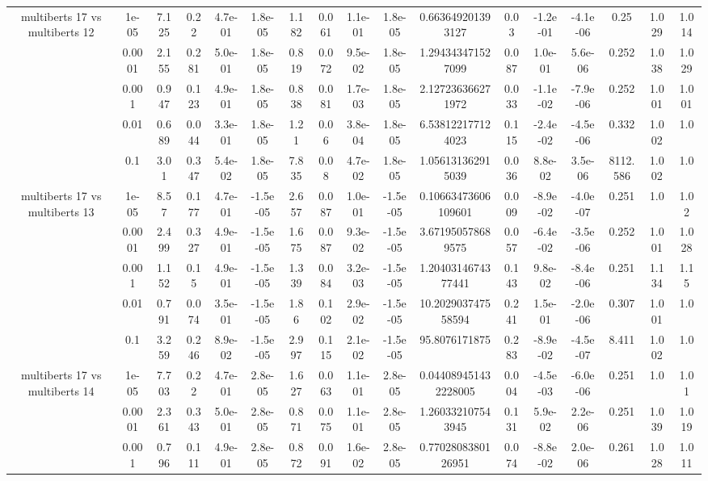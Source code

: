 \begin{tabular}{|c|c|c|c|c|c|c|c|c|c|c|c|c|c|c|c|c|}
\hline
\multirow{5}{*}{multiberts 17 vs multiberts 12} & 1e-05 & 7.125 & 0.22 & 4.7e-01 & 1.8e-05 & 1.182 & 0.061 & 1.1e-01 & 1.8e-05 & 0.663649201393127 & 0.03 & -1.2e-01 & -4.1e-06 & 0.25 & 1.029 & 1.014 \\
 & 0.0001 & 2.155 & 0.281 & 5.0e-01 & 1.8e-05 & 0.819 & 0.072 & 9.5e-02 & 1.8e-05 & 1.294343471527099 & 0.087 & 1.0e-01 & 5.6e-06 & 0.252 & 1.038 & 1.029 \\
 & 0.001 & 0.947 & 0.123 & 4.9e-01 & 1.8e-05 & 0.838 & 0.081 & 1.7e-03 & 1.8e-05 & 2.127236366271972 & 0.033 & -1.1e-02 & -7.9e-06 & 0.252 & 1.001 & 1.001 \\
 & 0.01 & 0.689 & 0.044 & 3.3e-01 & 1.8e-05 & 1.21 & 0.06 & 3.8e-04 & 1.8e-05 & 6.538122177124023 & 0.115 & -2.4e-02 & -4.5e-06 & 0.332 & 1.002 & 1.0 \\
 & 0.1 & 3.01 & 0.347 & 5.4e-02 & 1.8e-05 & 7.835 & 0.08 & 4.7e-02 & 1.8e-05 & 1.056131362915039 & 0.036 & 8.8e-02 & 3.5e-06 & 8112.586 & 1.002 & 1.0 \\
\hline
\multirow{5}{*}{multiberts 17 vs multiberts 13} & 1e-05 & 8.57 & 0.177 & 4.7e-01 & -1.5e-05 & 2.657 & 0.087 & 1.0e-01 & -1.5e-05 & 0.10663473606109601 & 0.009 & -8.9e-02 & -4.0e-07 & 0.251 & 1.0 & 1.02 \\
 & 0.0001 & 2.499 & 0.327 & 4.9e-01 & -1.5e-05 & 1.675 & 0.087 & 9.3e-02 & -1.5e-05 & 3.671950578689575 & 0.057 & -6.4e-02 & -3.5e-06 & 0.252 & 1.001 & 1.028 \\
 & 0.001 & 1.152 & 0.15 & 4.9e-01 & -1.5e-05 & 1.339 & 0.084 & 3.2e-03 & -1.5e-05 & 1.2040314674377441 & 0.143 & 9.8e-02 & -8.4e-06 & 0.251 & 1.134 & 1.15 \\
 & 0.01 & 0.791 & 0.074 & 3.5e-01 & -1.5e-05 & 1.86 & 0.102 & 2.9e-02 & -1.5e-05 & 10.202903747558594 & 0.241 & 1.5e-01 & -2.0e-06 & 0.307 & 1.001 & 1.0 \\
 & 0.1 & 3.259 & 0.246 & 8.9e-02 & -1.5e-05 & 2.997 & 0.115 & 2.1e-02 & -1.5e-05 & 95.8076171875 & 0.283 & -8.9e-02 & -4.5e-07 & 8.411 & 1.002 & 1.0 \\
\hline
\multirow{5}{*}{multiberts 17 vs multiberts 14} & 1e-05 & 7.703 & 0.22 & 4.7e-01 & 2.8e-05 & 1.627 & 0.063 & 1.1e-01 & 2.8e-05 & 0.044089451432228005 & 0.004 & -4.5e-03 & -6.0e-06 & 0.251 & 1.0 & 1.01 \\
 & 0.0001 & 2.361 & 0.343 & 5.0e-01 & 2.8e-05 & 0.871 & 0.075 & 1.1e-01 & 2.8e-05 & 1.260332107543945 & 0.131 & 5.9e-02 & 2.2e-06 & 0.251 & 1.039 & 1.019 \\
 & 0.001 & 0.796 & 0.111 & 4.9e-01 & 2.8e-05 & 0.872 & 0.091 & 1.6e-02 & 2.8e-05 & 0.7702808380126951 & 0.074 & -8.8e-02 & 2.0e-06 & 0.261 & 1.028 & 1.011 \\

\end{tabular}
